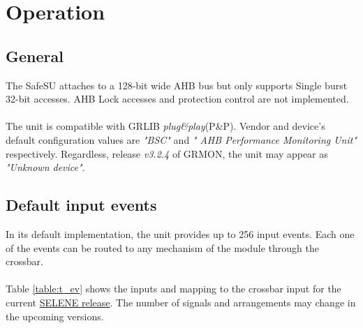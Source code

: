 \section{Operation}
\label{chapter2}
\subsection{General}
The SafeSU attaches to a 128-bit wide AHB bus but only supports Single burst 32-bit accesses. AHB Lock accesses and protection control are not implemented.\\
\\
The unit is compatible with GRLIB \textit{plug\&play}(P\&P). Vendor and device's default configuration values are  \textit{"BSC"} and \textit{" AHB Performance Monitoring Unit"} respectively. Regardless, release  \textit{v3.2.4}  of GRMON, the unit may appear as \textit{"Unknown device"}.
\subsection{Default input events}
In its default implementation, the unit provides up to 256 input events. Each one of the events can be routed to any mechanism of the module through the crossbar.\\
\\
Table \ref{table:t_ev} shows the inputs and mapping to the crossbar input for the current \href{https://gitlab.bsc.es/selene/selene-hardware/-/merge_requests/2}{SELENE release}. The number of signals and arrangements may change in the upcoming versions. \\

